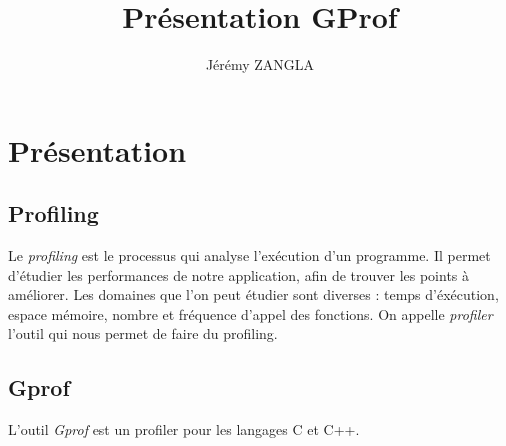 \documentclass[a4paper]{article}
\title{Présentation GProf}
\author{Jérémy ZANGLA}
\begin{document}
\maketitle
\pagebreak
\tableofcontents
\pagebreak
\section{Présentation}
\subsection{Profiling}
Le \emph{profiling} est le processus qui analyse l'exécution d'un programme.
Il permet d'étudier les performances de notre application, afin de trouver les points à améliorer.
Les domaines que l'on peut étudier sont diverses : temps d'éxécution, espace mémoire, nombre et fréquence d'appel des fonctions.
On appelle \emph{profiler} l'outil qui nous permet de faire du profiling.
\subsection{Gprof}
L'outil \emph{Gprof} est un profiler pour les langages C et C++. 
\end{document}
